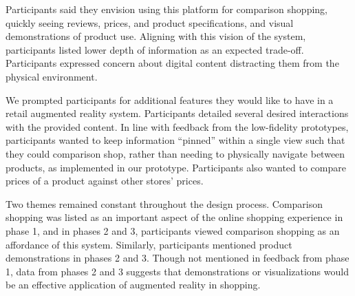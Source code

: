 Participants said they envision using this platform for comparison shopping, quickly seeing reviews, prices, and product specifications, and visual demonstrations of product use. Aligning with this vision of the system, participants listed lower depth of information as an expected trade-off. Participants expressed concern about digital content distracting them from the physical environment. 

We prompted participants for additional features they would like to have in a retail augmented reality system. Participants detailed several desired interactions with the provided content. In line with feedback from the low-fidelity prototypes, participants wanted to keep information ``pinned'' within a single view such that they could comparison shop, rather than needing to physically navigate between products, as implemented in our prototype. Participants also wanted to compare prices of a product against other stores' prices. 

Two themes remained constant throughout the design process. Comparison shopping was listed as an important aspect of the online shopping experience in phase 1, and in phases 2 and 3, participants viewed comparison shopping as an affordance of this system. Similarly, participants mentioned product demonstrations in phases 2 and 3. Though not mentioned in feedback from phase 1, data from phases 2 and 3 suggests that demonstrations or visualizations would be an effective application of augmented reality in shopping.